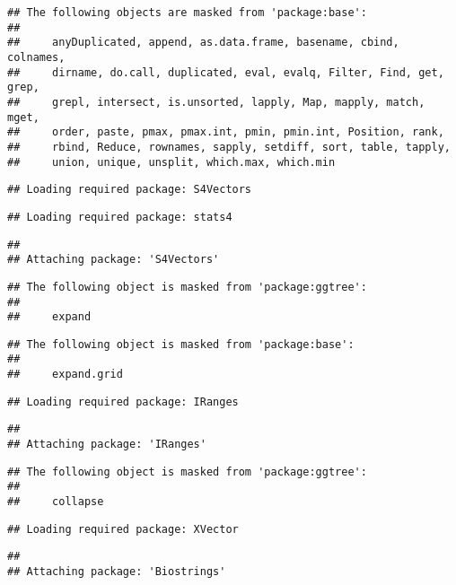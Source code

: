 \documentclass[
]{article}
\begin{document}
\begin{verbatim}
## The following objects are masked from 'package:base':
## 
##     anyDuplicated, append, as.data.frame, basename, cbind, colnames,
##     dirname, do.call, duplicated, eval, evalq, Filter, Find, get, grep,
##     grepl, intersect, is.unsorted, lapply, Map, mapply, match, mget,
##     order, paste, pmax, pmax.int, pmin, pmin.int, Position, rank,
##     rbind, Reduce, rownames, sapply, setdiff, sort, table, tapply,
##     union, unique, unsplit, which.max, which.min
\end{verbatim}

\begin{verbatim}
## Loading required package: S4Vectors
\end{verbatim}

\begin{verbatim}
## Loading required package: stats4
\end{verbatim}

\begin{verbatim}
## 
## Attaching package: 'S4Vectors'
\end{verbatim}

\begin{verbatim}
## The following object is masked from 'package:ggtree':
## 
##     expand
\end{verbatim}

\begin{verbatim}
## The following object is masked from 'package:base':
## 
##     expand.grid
\end{verbatim}

\begin{verbatim}
## Loading required package: IRanges
\end{verbatim}

\begin{verbatim}
## 
## Attaching package: 'IRanges'
\end{verbatim}

\begin{verbatim}
## The following object is masked from 'package:ggtree':
## 
##     collapse
\end{verbatim}

\begin{verbatim}
## Loading required package: XVector
\end{verbatim}

\begin{verbatim}
## 
## Attaching package: 'Biostrings'
\end{verbatim}
\end{document}
